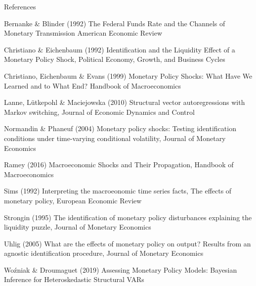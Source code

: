 \documentclass[notes,blackandwhite,mathsans,usenames,dvipsnames]{beamer}
\begin{document}
\begin{frame}{References}
\scriptsize

\smallskip Bernanke \& Blinder (1992) {\color{mcxs2}The Federal Funds Rate and the Channels of Monetary Transmission American Economic Review}

\smallskip Christiano \& Eichenbaum (1992) {\color{mcxs2}Identification and the Liquidity Effect of a Monetary Policy Shock, Political Economy, Growth, and Business Cycles }

\smallskip Christiano, Eichenbaum \& Evans (1999) {\color{mcxs2}Monetary Policy Shocks: What Have We Learned and to What End? Handbook of Macroeconomics}

\smallskip Lanne, L\"utkepohl \& Maciejowska (2010) {\color{mcxs2}Structural vector autoregressions with Markov switching, Journal of Economic Dynamics and Control}

\smallskip Normandin \& Phaneuf (2004) {\color{mcxs2}Monetary policy shocks: Testing identification conditions under time-varying conditional volatility, Journal of Monetary Economics}

\smallskip Ramey (2016) {\color{mcxs2}Macroeconomic Shocks and Their Propagation, Handbook of Macroeconomics}

\smallskip Sims (1992) {\color{mcxs2}Interpreting the macroeonomic time series facts, The effects of monetary policy, European Economic Review}

\smallskip Strongin (1995) {\color{mcxs2}The identification of monetary policy disturbances explaining the liquidity puzzle, Journal of Monetary Economics }

\smallskip Uhlig (2005) {\color{mcxs2}What are the effects of monetary policy on output? Results from an agnostic identification procedure, Journal of Monetary Economics}

\smallskip Wo\'zniak \& Droumaguet (2019) {\color{mcxs2}Assessing Monetary Policy Models: Bayesian Inference for Heteroskedastic Structural VARs}

\end{frame}
\end{document}

